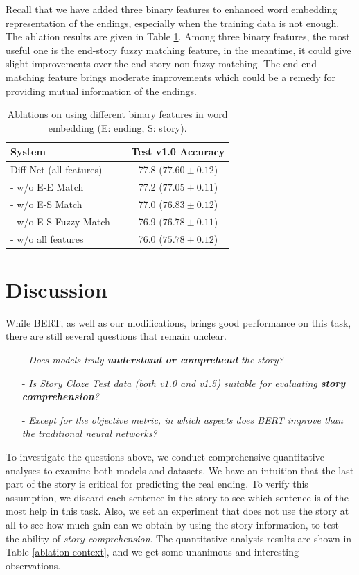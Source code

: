 \documentclass[letterpaper]{article} %
\begin{document}
Recall that we have added three binary features to enhanced word embedding representation of the endings, especially when the training data is not enough.
The ablation results are given in Table \ref{ablation-feature}.
Among three binary features, the most useful one is the end-story fuzzy matching feature, in the meantime, it could give slight improvements over the end-story non-fuzzy matching. The end-end matching feature brings moderate improvements which could be a remedy for providing mutual information of the endings.

\begin{table}[tp]
\begin{center}
\begin{tabular}{lc}
\toprule
{\bf System} & {\bf Test v1.0 Accuracy} \\
\midrule
Diff-Net (all features)~~~~					& 77.8 \small($77.60 \pm 0.12$) \\
- w/o E-E Match 						& 77.2 \small($77.05 \pm 0.11$) \\
- w/o E-S Match 						& 77.0 \small($76.83 \pm 0.12$) \\
- w/o E-S Fuzzy Match 					& 76.9 \small($76.78 \pm 0.11$) \\
- w/o all features 						& 76.0 \small($75.78 \pm 0.12$) \\
\bottomrule
\end{tabular}
\end{center}
\caption{\label{ablation-feature} Ablations on using different binary features in word embedding (E: ending, S: story).}
\end{table}


\section{Discussion}
While BERT, as well as our modifications, brings good performance on this task, there are still several questions that remain unclear.
\begin{itemize}[leftmargin=*]
\item[-] {\em Does models truly {\bf\em{understand or comprehend}} the story?}
\item[-] {\em Is Story Cloze Test data (both v1.0 and v1.5) suitable for evaluating {\bf\em{story comprehension}}?}
\item[-] {\em Except for the objective metric, in which aspects does BERT improve than the traditional neural networks?}
\end{itemize}

To investigate the questions above, we conduct comprehensive quantitative analyses to examine both models and datasets.
We have an intuition that the last part of the story is critical for predicting the real ending.
To verify this assumption, we discard each sentence in the story to see which sentence is of the most help in this task.
Also, we set an experiment that does not use the story at all to see how much gain can we obtain by using the story information, to test the ability of {\em story comprehension}.
The quantitative analysis results are shown in Table \ref{ablation-context}, and we get some unanimous and interesting observations.
\end{document}
